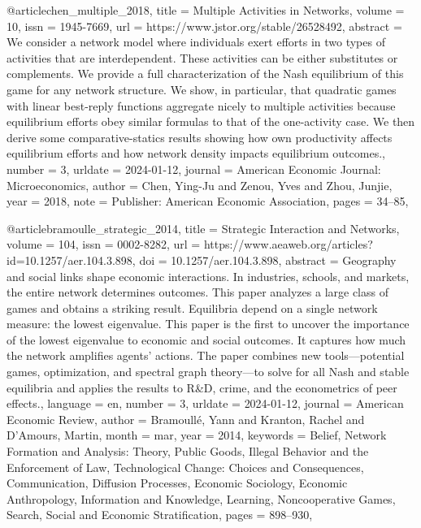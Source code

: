 {{{@article{chen_multiple_2018,
	title = {Multiple {Activities} in {Networks}},
	volume = {10},
	issn = {1945-7669},
	url = {https://www.jstor.org/stable/26528492},
	abstract = {We consider a network model where individuals exert efforts in two types of activities that are interdependent. These activities can be either substitutes or complements. We provide a full characterization of the Nash equilibrium of this game for any network structure. We show, in particular, that quadratic games with linear best-reply functions aggregate nicely to multiple activities because equilibrium efforts obey similar formulas to that of the one-activity case. We then derive some comparative-statics results showing how own productivity affects equilibrium efforts and how network density impacts equilibrium outcomes.},
	number = {3},
	urldate = {2024-01-12},
	journal = {American Economic Journal: Microeconomics},
	author = {Chen, Ying-Ju and Zenou, Yves and Zhou, Junjie},
	year = {2018},
	note = {Publisher: American Economic Association},
	pages = {34--85},
}

@article{bramoulle_strategic_2014,
	title = {Strategic {Interaction} and {Networks}},
	volume = {104},
	issn = {0002-8282},
	url = {https://www.aeaweb.org/articles?id=10.1257/aer.104.3.898},
	doi = {10.1257/aer.104.3.898},
	abstract = {Geography and social links shape economic interactions. In industries, schools, and markets, the entire network determines outcomes. This paper analyzes a large class of games and obtains a striking result. 
Equilibria depend on a single network measure: the lowest eigenvalue. This paper is the first to uncover the importance of the lowest eigenvalue to economic and social outcomes. It captures how much the network 
amplifies agents' actions. The paper combines new tools—potential games, optimization, and spectral graph theory—to solve for all Nash and stable equilibria and applies the results to R\&D, crime, and the econometrics of peer effects.},
	language = {en},
	number = {3},
	urldate = {2024-01-12},
	journal = {American Economic Review},
	author = {Bramoullé, Yann and Kranton, Rachel and D'Amours, Martin},
	month = mar,
	year = {2014},
	keywords = {Belief, Network Formation and Analysis: Theory, Public Goods, Illegal Behavior and the Enforcement of Law, Technological Change: Choices and Consequences, Communication, Diffusion Processes, Economic Sociology, Economic Anthropology, Information and Knowledge, Learning, Noncooperative Games, Search, Social and Economic Stratification},
	pages = {898--930},
}

}}}
